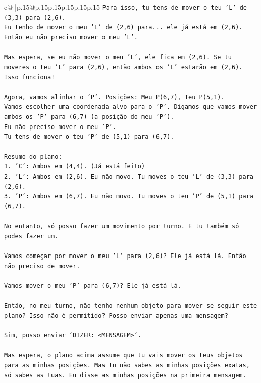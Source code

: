 \documentclass{article}
\begin{document}
{\begin{supertabular}{c@{$\;$}|p{.15\linewidth}@{}p{.15\linewidth}p{.15\linewidth}p{.15\linewidth}p{.15\linewidth}p{.15\linewidth}}
{{{\texttt{Para isso, tu tens de mover o teu 'L' de (3,3) para (2,6).} \\
\texttt{Eu tenho de mover o meu 'L' de (2,6) para... ele já está em (2,6). Então eu não preciso mover o meu 'L'.} \\
\\ 
\texttt{Mas espera, se eu não mover o meu 'L', ele fica em (2,6). Se tu moveres o teu 'L' para (2,6), então ambos os 'L' estarão em (2,6). Isso funciona!} \\
\\ 
\texttt{Agora, vamos alinhar o 'P'. Posições: Meu P(6,7), Teu P(5,1).} \\
\texttt{Vamos escolher uma coordenada alvo para o 'P'. Digamos que vamos mover ambos os 'P' para (6,7) (a posição do meu 'P').} \\
\texttt{Eu não preciso mover o meu 'P'.} \\
\texttt{Tu tens de mover o teu 'P' de (5,1) para (6,7).} \\
\\ 
\texttt{Resumo do plano:} \\
\texttt{1. 'C': Ambos em (4,4). (Já está feito)} \\
\texttt{2. 'L': Ambos em (2,6). Eu não movo. Tu moves o teu 'L' de (3,3) para (2,6).} \\
\texttt{3. 'P': Ambos em (6,7). Eu não movo. Tu moves o teu 'P' de (5,1) para (6,7).} \\
\\ 
\texttt{No entanto, só posso fazer um movimento por turno. E tu também só podes fazer um.} \\
\\ 
\texttt{Vamos começar por mover o meu 'L' para (2,6)? Ele já está lá. Então não preciso de mover.} \\
\\ 
\texttt{Vamos mover o meu 'P' para (6,7)? Ele já está lá.} \\
\\ 
\texttt{Então, no meu turno, não tenho nenhum objeto para mover se seguir este plano? Isso não é permitido? Posso enviar apenas uma mensagem?} \\
\\ 
\texttt{Sim, posso enviar `DIZER: <MENSAGEM>`.} \\
\\ 
\texttt{Mas espera, o plano acima assume que tu vais mover os teus objetos para as minhas posições. Mas tu não sabes as minhas posições exatas, só sabes as tuas. Eu disse as minhas posições na primeira mensagem.} \\
}}}
\end{supertabular}}
\end{document}
